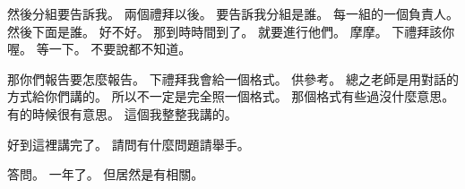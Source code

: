 \hypertarget{c01:cue:1880}{}然後分組要告訴我。
\hypertarget{c01:cue:1881}{}兩個禮拜以後。
\hypertarget{c01:cue:1882}{}要告訴我分組是誰。
\hypertarget{c01:cue:1883}{}每一組的一個負責人。
\hypertarget{c01:cue:1884}{}然後下面是誰。
\hypertarget{c01:cue:1885}{}好不好。
\hypertarget{c01:cue:1886}{}那到時時間到了。
\hypertarget{c01:cue:1887}{}就要進行他們。
\hypertarget{c01:cue:1888}{}摩摩。
\hypertarget{c01:cue:1889}{}下禮拜該你喔。
\hypertarget{c01:cue:1890}{}等一下。
\hypertarget{c01:cue:1891}{}不要說都不知道。

\hypertarget{c01:cue:1892}{}那你們報告要怎麼報告。
\hypertarget{c01:cue:1893}{}下禮拜我會給一個格式。
\hypertarget{c01:cue:1894}{}供參考。
\hypertarget{c01:cue:1895}{}總之老師是用對話的方式給你們講的。
\hypertarget{c01:cue:1896}{}所以不一定是完全照一個格式。
\hypertarget{c01:cue:1897}{}那個格式有些過沒什麼意思。
\hypertarget{c01:cue:1898}{}有的時候很有意思。
\hypertarget{c01:cue:1899}{}這個我整整我講的。

\hypertarget{c01:cue:1900}{}好到這裡講完了。
\hypertarget{c01:cue:1901}{}請問有什麼問題請舉手。

\hypertarget{c01:cue:1902}{}答問。
\hypertarget{c01:cue:1903}{}一年了。
\hypertarget{c01:cue:1904}{}但居然是有相關。

